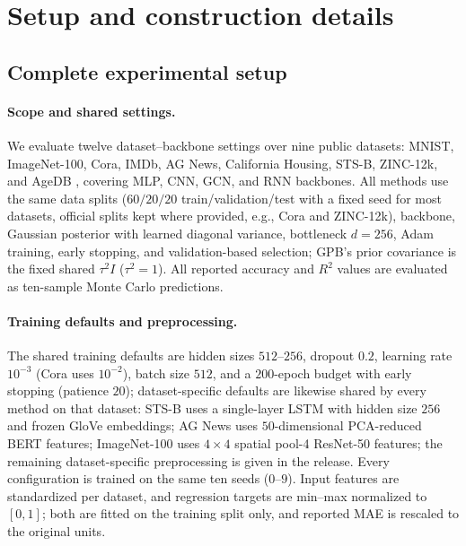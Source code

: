 \section{Setup and construction details}
\label{app:method}

\subsection{Complete experimental setup}
\label{app:setup-details}
\paragraph{Scope and shared settings.} We evaluate twelve dataset--backbone settings over nine public datasets:
MNIST, ImageNet-100, Cora, IMDb, AG News, California Housing, STS-B,
ZINC-12k, and AgeDB
\citep{lecun1998gradient,deng2009imagenet,sen2008collective,maas2011learning,
zhang2015character,pace1997sparse,cer2017semeval,irwin2012zinc,
moschoglou2017agedb}, covering MLP, CNN, GCN, and RNN backbones. All
methods use the same data splits ($60/20/20$ train/validation/test
with a fixed seed for most datasets, official splits kept where provided,
e.g., Cora and ZINC-12k), backbone, Gaussian posterior with learned diagonal
variance, bottleneck $d=256$, Adam \citep{kingma2015adam} training, early stopping, and
validation-based selection; GPB's prior covariance is the
fixed shared $\tau^2I$ ($\tau^2=1$). All reported accuracy and $R^2$ values
are evaluated as ten-sample Monte Carlo predictions.

\paragraph{Training defaults and preprocessing.} The shared training defaults are
hidden sizes $512$--$256$, dropout $0.2$, learning rate $10^{-3}$ (Cora
uses $10^{-2}$), batch size $512$, and a $200$-epoch budget with early
stopping (patience $20$); dataset-specific defaults are likewise shared
by every method on that dataset: STS-B uses a single-layer LSTM with
hidden size $256$ and frozen GloVe \citep{pennington2014glove} embeddings; AG News uses
$50$-dimensional PCA-reduced BERT \citep{devlin2019bert} features; ImageNet-100 uses $4\times4$
spatial pool-4 ResNet-50 \citep{he2016deep} features; the remaining dataset-specific
preprocessing is given in the release. Every configuration is trained
on the same ten seeds ($0$--$9$). Input features are standardized per
dataset, and regression targets are min--max normalized to $[0,1]$;
both are fitted on the training split only, and reported MAE is
rescaled to the original units.

